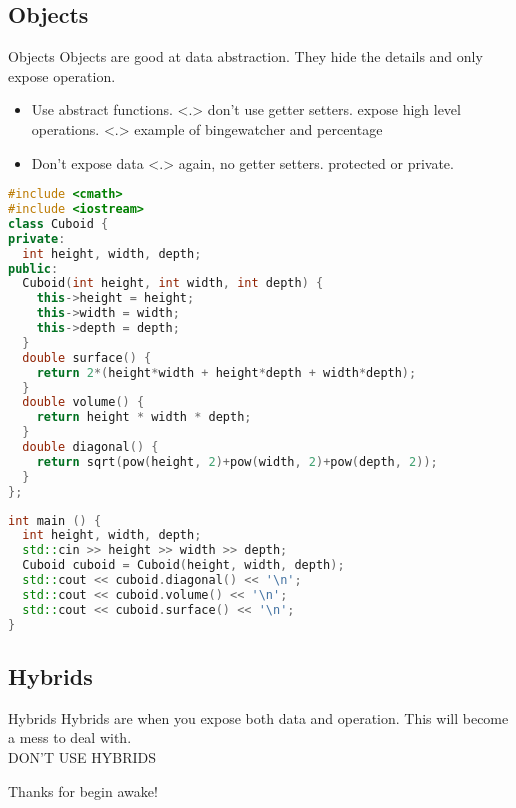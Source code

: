 \documentclass{beamer}
\begin{document}
\subsection{Objects}
\begin{frame}{Objects}
  Objects are good at data abstraction. They hide the details and only expose operation.
  \begin{itemize}[<+->]
    \item Use abstract functions. 
      \note[item]<.>{
        don't use getter setters. expose high level operations.
      }
      \note[item]<.>{
        example of bingewatcher and percentage
      }
    \item Don't expose data
      \note[item]<.>{
        again, no getter setters. protected or private.
      }
  \end{itemize}
\end{frame}
\begin{frame}[fragile]
  \begin{lstlisting}[language=C++]
#include <cmath>
#include <iostream>
class Cuboid {
private:
  int height, width, depth;
public:
  Cuboid(int height, int width, int depth) {
    this->height = height;
    this->width = width;
    this->depth = depth;
  }
  double surface() {
    return 2*(height*width + height*depth + width*depth);
  }
  double volume() {
    return height * width * depth;
  }
  double diagonal() {
    return sqrt(pow(height, 2)+pow(width, 2)+pow(depth, 2));
  }
};\end{lstlisting}
\end{frame}
\begin{frame}[fragile]
  \begin{lstlisting}[language=C++]
int main () {
  int height, width, depth;
  std::cin >> height >> width >> depth;
  Cuboid cuboid = Cuboid(height, width, depth);
  std::cout << cuboid.diagonal() << '\n';
  std::cout << cuboid.volume() << '\n';
  std::cout << cuboid.surface() << '\n';
} \end{lstlisting}
\end{frame}
\subsection{Hybrids}
\begin{frame}{Hybrids}
  Hybrids are when you expose both data and operation. This will become a mess to deal with.\\
  DON'T USE HYBRIDS
\end{frame}
\begin{frame}
  Thanks for begin awake!
\end{frame}
\end{document}
